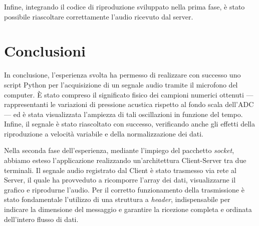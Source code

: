 \documentclass[12pt,a4paper]{article}
\begin{document}
Infine, integrando il codice di riproduzione sviluppato nella prima fase, è stato possibile riascoltare correttamente l'audio ricevuto dal server.

\section{Conclusioni}

In conclusione, l'esperienza svolta ha permesso di realizzare con successo uno script Python per l'acquisizione di un segnale audio tramite il microfono del computer. È stato compreso il significato fisico dei campioni numerici ottenuti — rappresentanti le variazioni di pressione acustica rispetto al fondo scala dell'ADC — ed è stata visualizzata l'ampiezza di tali oscillazioni in funzione del tempo. Infine, il segnale è stato riascoltato con successo, verificando anche gli effetti della riproduzione a velocità variabile e della normalizzazione dei dati.

Nella seconda fase dell'esperienza, mediante l'impiego del pacchetto \textit{socket}, abbiamo esteso l'applicazione realizzando un'architettura Client-Server tra due terminali. Il segnale audio registrato dal Client è stato trasmesso via rete al Server, il quale ha provveduto a ricomporre l'array dei dati, visualizzarne il grafico e riprodurne l'audio. Per il corretto funzionamento della trasmissione è stato fondamentale l'utilizzo di una struttura a \textit{header}, indispensabile per indicare la dimensione del messaggio e garantire la ricezione completa e ordinata dell'intero flusso di dati.
\end{document}
